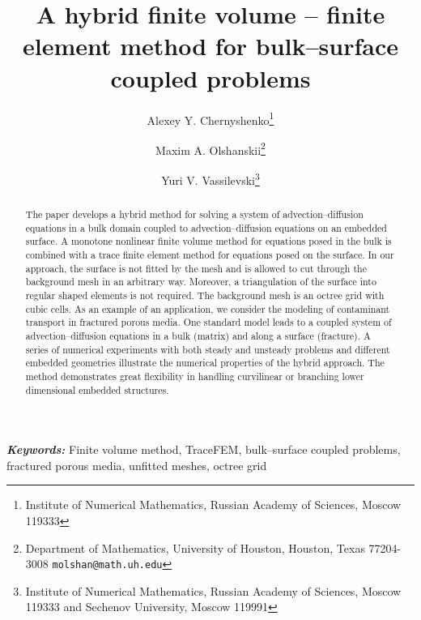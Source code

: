 \documentclass{article}
\providecommand{\keywords}[1]{\textbf{\textit{Keywords:}} #1}
\begin{document}
\title{A hybrid finite volume -- finite element method for bulk--surface coupled problems}
\author{
Alexey Y. Chernyshenko\thanks{
Institute of Numerical Mathematics, Russian Academy of Sciences, Moscow 119333}
\and
Maxim A. Olshanskii\thanks{Department of Mathematics, University of Houston, Houston, Texas 77204-3008 {\tt molshan@math.uh.edu}}
\and
Yuri V. Vassilevski\thanks{
Institute of Numerical Mathematics, Russian Academy of Sciences, Moscow 119333 and Sechenov University, Moscow 119991}
}


\date{}
\maketitle

\markboth{}{}

\begin{abstract}
The paper develops a hybrid method for solving a system of  advection--diffusion equations
in a bulk domain coupled to advection--diffusion equations on an embedded surface. A monotone nonlinear finite volume method for equations posed in the bulk is combined with a trace finite element method for equations posed on the surface.
In our approach, the surface is not fitted by the mesh and is allowed to cut through the background  mesh in an arbitrary way.   Moreover,  a triangulation of the surface into regular shaped elements is not required.
The background mesh is an octree grid with cubic cells.  %
 As an example of an application, we consider the modeling of contaminant transport in fractured porous media.
 One standard model leads to a coupled system of  advection--diffusion equations in a bulk (matrix) and along a surface (fracture). A series of numerical experiments with  both steady and unsteady problems and different embedded geometries illustrate the numerical properties of the hybrid approach.
The method demonstrates great flexibility in handling curvilinear or branching lower dimensional embedded structures.
 \end{abstract}

\keywords{
Finite volume method, TraceFEM, bulk--surface coupled problems, fractured porous media, unfitted meshes, octree grid
}



\end{document}
